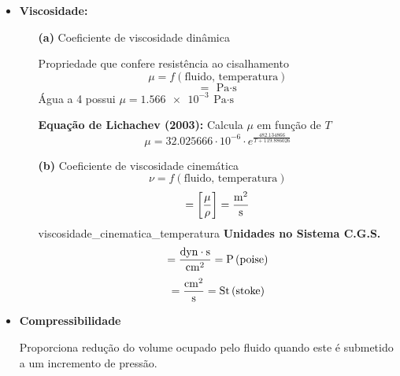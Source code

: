 \documentclass[
	a4paper, 
	12pt, 
	brazilian
]{article}
\begin{document}
\begin{itemize}
		\item\textbf{Viscosidade:}
		\begin{itemize}
			\item[\textbf{(a)}] Coeficiente de viscosidade dinâmica
			
			Propriedade que confere resistência ao cisalhamento
			\begin{equation}
			\mu=f(\textrm{fluido, temperatura})
			\end{equation}
			\begin{equation}
			[\,\mu\,]=\SI{}{\pascal\cdot\second}
			\end{equation}
			Água a \SI{4}{\SIUnitSymbolCelsius} possui $\mu=\SI{1.566e-3}{\pascal\cdot\second}$
			
			\textbf{Equação de Lichachev (2003):}
			Calcula $\mu$ em função de $T$
			\begin{equation}
			\mu=32.025666\cdot 10^{-6}\cdot e^{\frac{482.134866}{T+119.886026}}
			\end{equation}
			
			\item[\textbf{(b)}] Coeficiente de viscosidade cinemática
				\begin{equation}
					\nu=f(\textrm{fluido, temperatura})
				\end{equation}
				\begin{equation}
					[\,\nu\,]=\left[\dfrac{\mu}{\rho}\right]=\SI{}{\dfrac{\meter^{2}}{\second}}
				\end{equation}
				{viscosidade_cinematica_temperatura}
				\textbf{Unidades no Sistema C.G.S.}
				\begin{equation}
					[\,\mu\,]=\SI{}{\dfrac{dyn\cdot\second}{\centi\meter^{2}}}=\SI{}{P\,(poise)}
				\end{equation}
				\begin{equation}
					[\,\nu\,]=\SI{}{\dfrac{\centi\meter^{2}}{\second}}=\SI{}{St\,(stoke)}
				\end{equation}
		\end{itemize}
		\item\textbf{Compressibilidade}
		
		Proporciona redução do volume ocupado pelo fluido quando este é submetido a um incremento de pressão.
		

\end{itemize}
\end{document}
